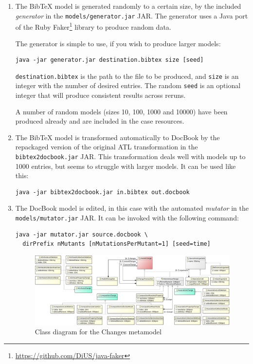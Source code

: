 \documentclass[a4paper]{scrartcl}
\newcommand*{\file}[1]{\texttt{#1}}
\begin{document}
\begin{enumerate}
\item The BibTeX model is generated randomly to a certain size, by the included
  \emph{generator} in the \file{models/generator.jar} JAR. The generator uses a
  Java port of the Ruby Faker\footnote{\url{https://github.com/DiUS/java-faker}}
  library to produce random data.

  The generator is simple to use, if you wish to produce larger models:
\begin{verbatim}
java -jar generator.jar destination.bibtex size [seed]
\end{verbatim}

  \file{destination.bibtex} is the path to the file to be produced, and
  \file{size} is an integer with the number of desired entries. The random
  \file{seed} is an optional integer that will produce consistent results across
  reruns.

  A number of random models (sizes 10, 100, 1000 and 10000) have been produced
  already and are included in the case resources.

\item The BibTeX model is transformed automatically to DocBook by the repackaged
  version of the original ATL transformation in the \file{bibtex2docbook.jar}
  JAR. This transformation deals well with models up to 1000 entries, but seems
  to struggle with larger models. It can be used like this:
\begin{verbatim}
java -jar bibtex2docbook.jar in.bibtex out.docbook
\end{verbatim}

\item The DocBook model is edited, in this case with the automated
  \emph{mutator} in the \file{models/mutator.jar} JAR. It can be invoked with
  the following command:
\begin{verbatim}
java -jar mutator.jar source.docbook \
  dirPrefix nMutants [nMutationsPerMutant=1] [seed=time]
\end{verbatim}

\begin{figure}
  \centering
  \includegraphics[width=\textwidth,height=\textheight,keepaspectratio]{changes}
  \caption{Class diagram for the Changes metamodel}
  \label{fig:changes-mm}
\end{figure}


\end{enumerate}
\end{document}
